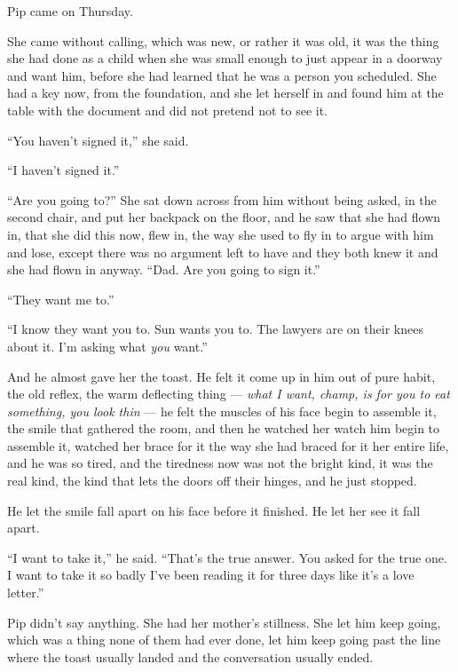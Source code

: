 \documentclass[11pt,openany]{book}
\newcommand{\scenebreak}{\par\vspace{0.5\baselineskip}\begin{center}\textasteriskcentered\quad\textasteriskcentered\quad\textasteriskcentered\end{center}\vspace{0.5\baselineskip}\par}
\begin{document}
\scenebreak


Pip came on Thursday.

She came without calling, which was new, or rather it was old, it was the thing she had done as a child when she was small enough to just appear in a doorway and want him, before she had learned that he was a person you scheduled. She had a key now, from the foundation, and she let herself in and found him at the table with the document and did not pretend not to see it.

``You haven't signed it,'' she said.

``I haven't signed it.''

``Are you going to?'' She sat down across from him without being asked, in the second chair, and put her backpack on the floor, and he saw that she had flown in, that she did this now, flew in, the way she used to fly in to argue with him and lose, except there was no argument left to have and they both knew it and she had flown in anyway. ``Dad. Are you going to sign it.''

``They want me to.''

``I know they want you to. Sun wants you to. The lawyers are on their knees about it. I'm asking what \textit{you} want.''

And he almost gave her the toast. He felt it come up in him out of pure habit, the old reflex, the warm deflecting thing --- \textit{what I want, champ, is for you to eat something, you look thin} --- he felt the muscles of his face begin to assemble it, the smile that gathered the room, and then he watched her watch him begin to assemble it, watched her brace for it the way she had braced for it her entire life, and he was so tired, and the tiredness now was not the bright kind, it was the real kind, the kind that lets the doors off their hinges, and he just stopped.

He let the smile fall apart on his face before it finished. He let her see it fall apart.

``I want to take it,'' he said. ``That's the true answer. You asked for the true one. I want to take it so badly I've been reading it for three days like it's a love letter.''

Pip didn't say anything. She had her mother's stillness. She let him keep going, which was a thing none of them had ever done, let him keep going past the line where the toast usually landed and the conversation usually ended.
\end{document}
